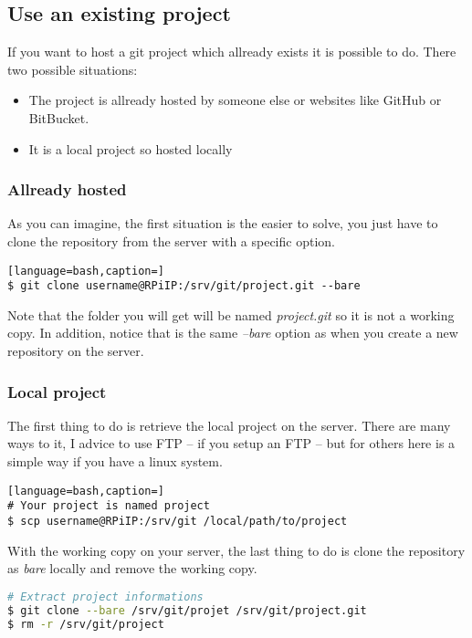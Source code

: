 \subsection{Use an existing project}
If you want to host a git project which allready exists it is possible to do. 
There two possible situations:
\begin{itemize}
	\item The project is allready hosted by someone else or websites like GitHub 
		  or BitBucket.
	\item It is a local project so hosted locally
\end{itemize}

\subsubsection{Allready hosted}
As you can imagine, the first situation is the easier to solve, you just have to 
clone the repository from the server with a specific option.

\begin{lstlisting}[language=bash,caption=]
$ git clone username@RPiIP:/srv/git/project.git --bare
\end{lstlisting}

Note that the folder you will get will be named \emph{project.git} so it is not a 
working copy. In addition, notice that is the same \emph{--bare} option as when 
you create a new repository on the server.

\subsubsection{Local project}
The first thing to do is retrieve the local project on the server. There are many 
ways to it, I advice to use FTP -- if you setup an FTP -- but for others here is 
a simple way if you have a linux system.

\begin{lstlisting}[language=bash,caption=]
# Your project is named project
$ scp username@RPiIP:/srv/git /local/path/to/project
\end{lstlisting}

With the working copy on your server, the last thing to do is clone the repository 
as \emph{bare} locally and remove the working copy.

\begin{lstlisting}[language=bash,caption=Host repository from local copy]
# Extract project informations
$ git clone --bare /srv/git/projet /srv/git/project.git
$ rm -r /srv/git/project
\end{lstlisting}
	
